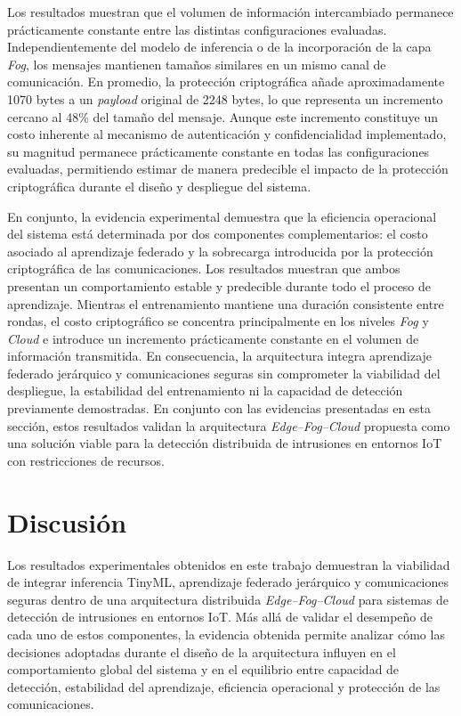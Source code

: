 \documentclass[journal,article,submit,moreauthors]{Definitions/mdpi}
\begin{document}
Los resultados muestran que el volumen de información intercambiado permanece prácticamente constante entre las distintas configuraciones evaluadas. Independientemente del modelo de inferencia o de la incorporación de la capa \textit{Fog}, los mensajes mantienen tamaños similares en un mismo canal de comunicación. En promedio, la protección criptográfica añade aproximadamente 1070 bytes a un \textit{payload} original de 2248 bytes, lo que representa un incremento cercano al 48\% del tamaño del mensaje. Aunque este incremento constituye un costo inherente al mecanismo de autenticación y confidencialidad implementado, su magnitud permanece prácticamente constante en todas las configuraciones evaluadas, permitiendo estimar de manera predecible el impacto de la protección criptográfica durante el diseño y despliegue del sistema.

En conjunto, la evidencia experimental demuestra que la eficiencia operacional del sistema está determinada por dos componentes complementarios: el costo asociado al aprendizaje federado y la sobrecarga introducida por la protección criptográfica de las comunicaciones. Los resultados muestran que ambos presentan un comportamiento estable y predecible durante todo el proceso de aprendizaje. Mientras el entrenamiento mantiene una duración consistente entre rondas, el costo criptográfico se concentra principalmente en los niveles \textit{Fog} y \textit{Cloud} e introduce un incremento prácticamente constante en el volumen de información transmitida. En consecuencia, la arquitectura integra aprendizaje federado jerárquico y comunicaciones seguras sin comprometer la viabilidad del despliegue, la estabilidad del entrenamiento ni la capacidad de detección previamente demostradas. En conjunto con las evidencias presentadas en esta sección, estos resultados validan la arquitectura \textit{Edge--Fog--Cloud} propuesta como una solución viable para la detección distribuida de intrusiones en entornos IoT con restricciones de recursos.

\section{Discusión}

Los resultados experimentales obtenidos en este trabajo demuestran la viabilidad de integrar inferencia TinyML, aprendizaje federado jerárquico y comunicaciones seguras dentro de una arquitectura distribuida \textit{Edge--Fog--Cloud} para sistemas de detección de intrusiones en entornos IoT. Más allá de validar el desempeño de cada uno de estos componentes, la evidencia obtenida permite analizar cómo las decisiones adoptadas durante el diseño de la arquitectura influyen en el comportamiento global del sistema y en el equilibrio entre capacidad de detección, estabilidad del aprendizaje, eficiencia operacional y protección de las comunicaciones.
\end{document}
